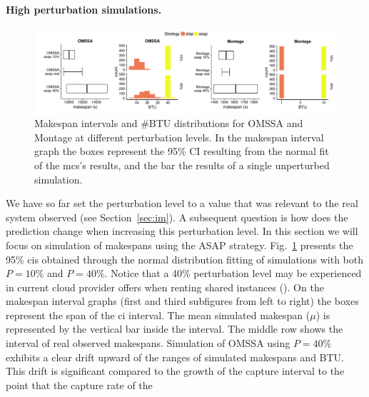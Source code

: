 \documentclass[]{llncs}
\begin{document}
\paragraph{High perturbation simulations.}\label{sec:sa}
\begin{figure}[bt]
	\includegraphics[width=\textwidth]{gfx/int_plot.pdf}
	\caption[caption]{Makespan intervals and \#BTU distributions for OMSSA and 
	Montage at different perturbation levels. In the makespan interval graph 
	the boxes represent the 95\% CI resulting from the normal fit of the
	\acs{mcs}'s results, and the bar the results of a single unperturbed 
	simulation.%
	}
	\label{fig:int}
\end{figure}
We have so  far set the perturbation level  to a value that was  relevant to the
real system observed  (see Section~\ref{sec:im}).  A subsequent  question is how
does the  prediction change  when increasing this  perturbation level.   In this
section  we will  focus  on simulation  of makespans  using  the ASAP  strategy.
Fig.~\ref{fig:int}  presents  the  95\%  \acp{ci} obtained  through  the  normal
distribution fitting of  simulations with both $P\!=\!10\%$ and $P\!=\!40\%$.  Notice that a
40\% perturbation level may be experienced in current cloud provider offers when
renting shared  instances (\cite{LeitnerC16}).  On the  makespan interval graphs
(first and third subfigures from left to  right) the boxes represent the span of
the \ac{ci}  interval. The mean  simulated makespan ($\mu{}$) is  represented by
the vertical bar inside the interval. The middle row shows the interval of real 
observed makespans.
%
Simulation of OMSSA using $P\!=\!40\%$ exhibits a clear drift upward of
the ranges of simulated makespans and BTU. This drift is significant compared to
the growth of the capture interval to the point that the capture rate of the
\end{document}
